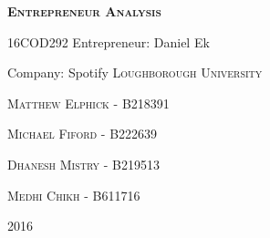 \begin{titlepage}
\begin{center}
\textbf{\textsc{\Huge Entrepreneur Analysis}}
\par
\vspace{0.5cm}
\textsc{\huge 16COD292}
\vfill
\Huge Entrepreneur: Daniel Ek
\par
\Huge Company: Spotify
\vfill
\textsc{\Huge Loughborough University}
\vspace{1cm}
\par
\textsc{\huge Matthew Elphick - B218391}
\par
\vspace{0.2cm}
\textsc{\huge Michael Fiford - B222639}
\par
\vspace{0.2cm}
\textsc{\huge Dhanesh Mistry - B219513}
\par
\vspace{0.2cm}
\textsc{\huge Medhi Chikh - B611716}
\vspace{1cm}
\par
\textsc{\Huge 2016}
\end{center}
\end{titlepage}